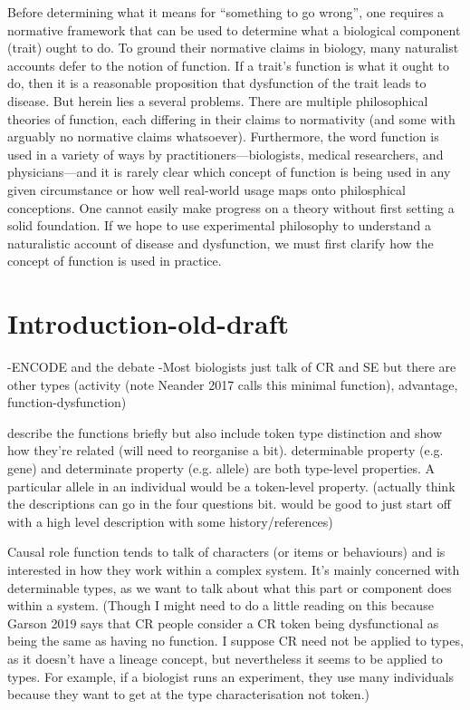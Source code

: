 \documentclass{article}
\begin{document}
Before determining what it means for ``something to go wrong'', one requires a normative framework that can be used to determine what a biological component (trait) ought to do.
To ground their normative claims in biology, many naturalist accounts defer to the notion of function.
If a trait's function is what it ought to do, then it is a reasonable proposition that dysfunction of the trait leads to disease.
But herein lies a several problems.
There are multiple philosophical theories of function, each differing in their claims to normativity (and some with arguably no normative claims whatsoever).
Furthermore, the word function is used in a variety of ways by practitioners---biologists, medical researchers, and physicians---and it is rarely clear which concept of function is being used in any given circumstance or how well real-world usage maps onto philosphical conceptions.
One cannot easily make progress on a theory without first setting a solid foundation.
If we hope to use experimental philosophy to understand a naturalistic account of disease and dysfunction, we must first clarify how the concept of function is used in practice.






\section{Introduction-old-draft}
\label{sec:introduction-1}

-ENCODE and the debate
-Most biologists just talk of CR and SE but there are other types (activity (note Neander 2017 calls this minimal function), advantage, function-dysfunction)

describe the functions briefly but also include token type distinction and show how they're related (will need to reorganise a bit). determinable property (e.g. gene) and determinate property (e.g. allele) are both type-level properties. A particular allele in an individual would be a token-level property. (actually think the descriptions can go in the four questions bit. would be good to just start off with a high level description with some history/references)

Causal role function tends to talk of characters (or items or behaviours) and is interested in how they work within a complex system. It's mainly concerned with determinable types, as we want to talk about what this part or component does within a system. (Though I might need to do a little reading on this because Garson 2019 says that CR people consider a CR token being dysfunctional as being the same as having no function. I suppose CR need not be applied to types, as it doesn't have a lineage concept, but nevertheless it seems to be applied to types. For example, if a biologist runs an experiment, they use many individuals because they want to get at the type characterisation not token.)
\end{document}
